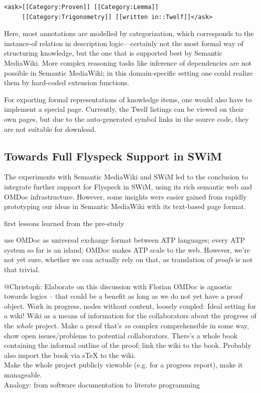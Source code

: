 \documentclass{llncs}
\begin{document}
\begin{lstlisting}
<ask>[[Category:Proven]] [[Category:Lemma]]
     [[Category:Trigonometry]] [[written in::Twelf]]</ask>
\end{lstlisting}

Here, most annotations are modelled by categorization, which corresponds to the
instance-of relation in description logic---certainly not the most formal way of
structuring knowledge, but the one that is supported best by Semantic MediaWiki.  More
complex reasoning tasks like inference of dependencies are not possible in Semantic
MediaWiki; in this domain-specific setting one could realize them by hard-coded extension
functions.

For exporting formal representations of knowledge items, one would also have to implement
a special page.  Currently, the Twelf listings can be viewed on their own pages, but due
to the auto-generated symbol links in the source code, they are not suitable for download.

\subsection{Towards Full Flyspeck Support in SWiM}
\label{sec:flyspeck-swim}

The experiments with Semantic MediaWiki and SWiM led to the conclusion to integrate
further support for Flyspeck in SWiM, using its rich semantic web and OMDoc
infrastructure.  However, some insights were easier gained from rapidly
prototyping our ideas in Semantic MediaWiki with its text-based page format.

first lessons learned from the pre-study

use OMDoc as universal exchange format between ATP languages; every ATP system so far is
an island; OMDoc makes ATP scale to the web.  However, we're not yet sure, whether we can actually rely on that, as translation of \emph{proofs} is not
that trivial.


\begin{todo}{@Christoph: Elaborate on this discussion with Florian}
  OMDoc is agnostic towards logics -- that could be a benefit as long as we do not yet
  have a proof object. Work in progress, nodes without content, loosely coupled: Ideal
  setting for a wiki!  Wiki as a means of information for the collaborators about the
  progress of the \emph{whole} project.  Make a proof that's \emph{so} complex
  comprehensible in some way, show open issues/problems to potential collaborators.
  There's a whole book containing the informal outline of the proof; link the wiki to the
  book.  Probably also import the book via sTeX to the wiki.\\
  Make the whole project publicly viewable (e.g. for a progress report), make it
  manageable.\\
  Analogy: from software documentation to literate programming
\end{todo}
\end{document}
